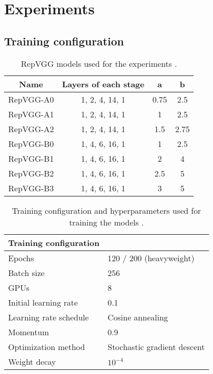 \section{Experiments} \label{experiments}

\subsection{Training configuration}

\begin{table}
	\begin{center}
		\begin{tabular}{c|c|c|c} 
			\hline
			Name & Layers of each stage & a & b \\
			\hline
			RepVGG-A0 & 1, 2, 4, 14, 1 & 0.75 & 2.5 \\
			RepVGG-A1 & 1, 2, 4, 14, 1 & 1 & 2.5 \\
			RepVGG-A2 & 1, 2, 4, 14, 1 & 1.5 & 2.75 \\
			\hline
			RepVGG-B0 & 1, 4, 6, 16, 1 & 1 & 2.5 \\
			RepVGG-B1 & 1, 4, 6, 16, 1 & 2 & 4 \\
			RepVGG-B2 & 1, 4, 6, 16, 1 & 2.5 & 5 \\
			RepVGG-B3 & 1, 4, 6, 16, 1 & 3 & 5 \\
			\hline
		\end{tabular}
	\end{center}
	\caption{RepVGG models used for the experiments \cite{XiaohanDing.2021}.}
	\label{tab:models}
\end{table}

\begin{table}
	\begin{center}
		\begin{tabular}{ll} 
			\hline
			Training configuration & \\
			\hline
			Epochs & 120 / 200 (heavyweight) \\
			Batch size & 256 \\
			GPUs & 8 \\
			Initial learning rate & 0.1 \\
			Learning rate schedule & Cosine annealing \\
			Momentum & 0.9 \\
			Optimization method & Stochastic gradient descent \\
			Weight decay & $10^{-4}$ \\
			\hline
		\end{tabular}
	\end{center}
	\caption{Training configuration and hyperparameters used for training the models \cite{XiaohanDing.2021}.}
	\label{tab:hyperparameter}
\end{table}

